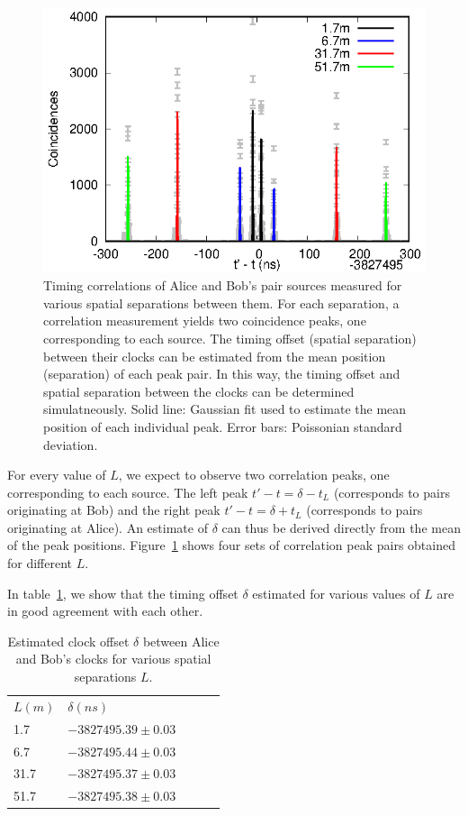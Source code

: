 \documentclass[aps,pra,onecolumn, superscriptaddress]{revtex4}
\begin{document}
\begin{figure}[htbp]
  \centering
  \includegraphics[width=16cm]{figures/g2/g2.eps}
  \caption{\label{fig:g2}
  Timing correlations of Alice and Bob's pair sources measured for various spatial separations between them.  
  For each separation, a correlation measurement yields two coincidence peaks, 
  one corresponding to each source.
  The timing offset (spatial separation) between their clocks can be estimated from the mean position (separation) of each peak pair.
  In this way, the timing offset and spatial separation between the clocks can be determined simulatneously.
  Solid line: Gaussian fit used to estimate the mean position of each individual peak. 
  Error bars: Poissonian standard deviation.
  }
\end{figure}

For every value of $L$, we expect to observe two correlation peaks, one corresponding to each source.
The left peak $t' - t = \delta - t_L$ (corresponds to pairs originating at Bob) and 
the right peak $t' - t = \delta + t_L$ (corresponds to pairs originating at Alice).
An estimate of $\delta$ can thus be derived directly from the mean of the peak positions. 
Figure~\ref{fig:g2} shows four sets of correlation peak pairs obtained for different $L$.


In table~\ref{table:offsets}, we show that the timing offset $\delta$ estimated for various values of $L$ are in good agreement with each other.

\begin{table}[htbp]
\centering
\label{table:offsets}
\begin{tabular}{lllll}
$L(m)$ & $\delta(ns)$\\
 1.7 & $-3827495.39\pm0.03$\\
 6.7 & $-3827495.44\pm0.03$ \\
 31.7 & $-3827495.37\pm0.03$\\
 51.7 & $-3827495.38\pm0.03$
\end{tabular}
\caption{Estimated clock offset $\delta$ between Alice and Bob's clocks for various spatial separations $L$.}
\end{table}

     
\end{document}
